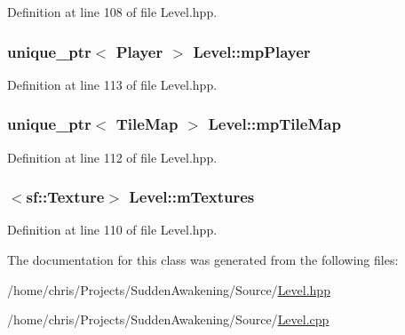 Definition at line 108 of file Level.\-hpp.

\hypertarget{class_level_a1cb20848f0e9d49a6469b4682e105d94}{
\subsubsection[{mp\-Player}]{\setlength{\rightskip}{0pt plus 5cm}unique\-\_\-ptr$<$ {\bf Player} $>$ Level\-::mp\-Player\hspace{0.3cm}{\ttfamily [protected]}}}\label{class_level_a1cb20848f0e9d49a6469b4682e105d94}


Definition at line 113 of file Level.\-hpp.

\hypertarget{class_level_a2294842a4de2c0fbe9b28a670088b5c4}{
\subsubsection[{mp\-Tile\-Map}]{\setlength{\rightskip}{0pt plus 5cm}unique\-\_\-ptr$<$ {\bf Tile\-Map} $>$ Level\-::mp\-Tile\-Map\hspace{0.3cm}{\ttfamily [protected]}}}\label{class_level_a2294842a4de2c0fbe9b28a670088b5c4}


Definition at line 112 of file Level.\-hpp.

\hypertarget{class_level_a17bf54432fa53317ab5d7ffffbfdec6f}{
\subsubsection[{m\-Textures}]{$<$sf\-::\-Texture$>$ Level\-::m\-Textures\hspace{0.3cm}{\ttfamily [protected]}}}\label{class_level_a17bf54432fa53317ab5d7ffffbfdec6f}


Definition at line 110 of file Level.\-hpp.



The documentation for this class was generated from the following files\-:\begin{DoxyCompactItemize}
\item 
/home/chris/\-Projects/\-Sudden\-Awakening/\-Source/\hyperlink{_level_8hpp}{Level.\-hpp}\item 
/home/chris/\-Projects/\-Sudden\-Awakening/\-Source/\hyperlink{_level_8cpp}{Level.\-cpp}\end{DoxyCompactItemize}
